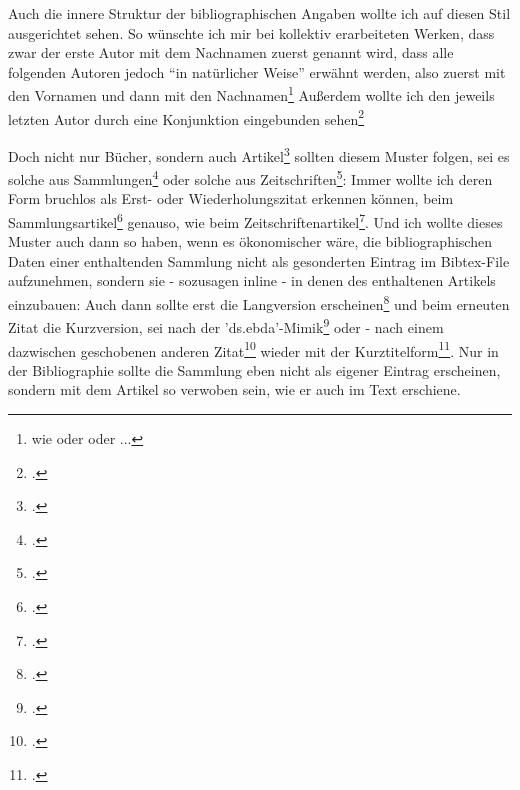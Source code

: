 Auch die innere Struktur der bibliographischen Angaben wollte ich auf diesen Stil
ausgerichtet sehen. So wünschte ich mir bei kollektiv erarbeiteten Werken, dass
zwar der erste Autor mit dem Nachnamen zuerst genannt wird, dass alle folgenden
Autoren jedoch "`in natürlicher Weise"' erwähnt werden, also zuerst mit den
Vornamen und dann mit den Nachnamen\footnote{ wie \cite[hier bei:][]{Woods1991a}
oder \cite[hier bei:][]{RusNor2004a} oder ...} Außerdem wollte ich den jeweils
letzten Autor durch eine Konjunktion eingebunden sehen\footcite[... hier
bei:][]{SegEvaTay2009a}

Doch nicht nur Bücher, sondern auch Artikel\footcite[vgl. z.B.][]{Hays1985a}
sollten diesem Muster folgen, sei es solche aus Sammlungen\footcite[s.
etwa][]{Brachman1985a} oder solche aus Zeitschriften\footcite[s.
etwa][]{McCarthy1980a}: Immer wollte ich deren Form bruchlos als Erst- oder
Wiederholungszitat erkennen können, beim Sammlungsartikel\footcite[vgl.
erneut][]{Hays1985a} genauso, wie beim Zeitschriftenartikel\footcite[s.
nochmals][]{McCarthy1980a}. Und ich wollte dieses Muster auch dann so haben,
wenn es ökonomischer wäre, die bibliographischen Daten einer enthaltenden
Sammlung nicht als gesonderten Eintrag im Bibtex-File aufzunehmen, sondern sie -
sozusagen inline - in denen des enthaltenen Artikels einzubauen: Auch dann
sollte erst die Langversion erscheinen\footcite[vgl.][23]{RotCum2011a} und beim
erneuten Zitat die Kurzversion, sei nach der
'ds.ebda'-Mimik\footcite[vgl.][23]{RotCum2011a} oder - nach einem dazwischen
geschobenen anderen Zitat\footcite[vgl.][9]{KantKdU1974} wieder mit der
Kurztitelform\footcite[vgl.][23]{RotCum2011a}. Nur in der Bibliographie sollte
die Sammlung eben nicht als eigener Eintrag erscheinen, sondern mit dem Artikel
so verwoben sein, wie er auch im Text erschiene.

